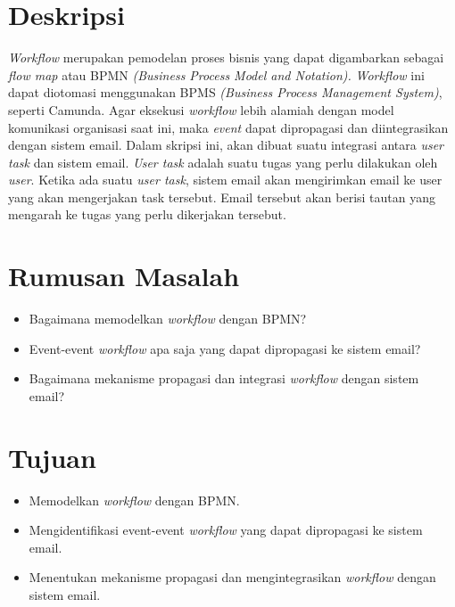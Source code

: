 \documentclass[a4paper,twoside]{article}
\begin{document}
\title{\@judultopik}
\author{\nama \textendash \@npm} 

\newcommand{\nama}{Lucky Senjaya Darmawan}
\newcommand{\@npm}{2012730009}
\newcommand{\@judultopik}{Studi dan Integrasi Workflow menggunakan BPMS dan Sistem Email} %
\newcommand{\jumpemb}{1} %
\newcommand{\tanggal}{31/01/2016}


\maketitle


\section{Deskripsi}
\textit{Workflow} merupakan pemodelan proses bisnis yang dapat digambarkan sebagai \textit{flow map} atau BPMN \textit{(Business Process Model and Notation).} \textit{Workflow} ini dapat diotomasi menggunakan BPMS \textit{(Business Process Management System)}, seperti Camunda. Agar eksekusi \textit{workflow} lebih alamiah dengan model komunikasi organisasi saat ini, maka \textit{event} dapat dipropagasi dan diintegrasikan dengan sistem email. 
Dalam skripsi ini, akan dibuat suatu integrasi antara \textit{user task} dan sistem email. \textit{User task} adalah suatu tugas yang perlu dilakukan oleh \textit{user}. Ketika ada suatu \textit{user task}, sistem email akan mengirimkan email ke user yang akan mengerjakan task tersebut. Email tersebut akan berisi tautan yang mengarah ke tugas yang perlu dikerjakan tersebut.

\section{Rumusan Masalah}
\begin{itemize}
	\item Bagaimana memodelkan \textit{workflow} dengan BPMN?
	\item Event-event \textit{workflow} apa saja yang dapat dipropagasi ke sistem email?
	\item Bagaimana mekanisme propagasi dan integrasi \textit{workflow} dengan sistem email?
\end{itemize}
\section{Tujuan}
\begin{itemize}
	\item Memodelkan \textit{workflow} dengan BPMN.
	\item Mengidentifikasi event-event \textit{workflow} yang dapat dipropagasi ke sistem email.
	\item Menentukan mekanisme propagasi dan mengintegrasikan \textit{workflow} dengan sistem email.
\end{itemize}
\end{document}
